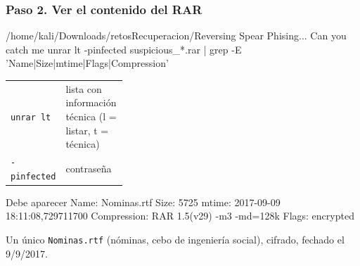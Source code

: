 \documentclass[11pt,a4paper]{article}
\begin{document}
\subsubsection*{Paso 2. Ver el contenido del RAR}
\begin{comando}{/home/kali/Downloads/retosRecuperacion/Reversing Spear Phising... Can you catch me}
unrar lt -pinfected suspicious_*.rar | grep -E 'Name|Size|mtime|Flags|Compression'
\end{comando}
\begin{tcolorbox}[enhanced, breakable, colback=gray!3, colframe=gray!35, boxrule=0.3pt, arc=1pt, left=4pt, right=4pt, top=2pt, bottom=2pt, fonttitle=\sffamily\scriptsize\bfseries, coltitle=black!70, colbacktitle=gray!10, title={Qué hace cada parte}, attach title to upper, before skip=2pt, after skip=4pt, fontupper=\small]
\par{\renewcommand{\arraystretch}{1.12}\begin{tabularx}{\linewidth}{@{}>{\raggedright\arraybackslash}p{0.33\linewidth}>{\raggedright\arraybackslash}X@{}}
\texttt{unrar lt} & lista con información técnica (l = listar, t = técnica) \\
\texttt{-pinfected} & contraseña \\
\end{tabularx}}
\end{tcolorbox}
\begin{salida}{Debe aparecer}
        Name: Nominas.rtf
        Size: 5725
       mtime: 2017-09-09 18:11:08,729711700
 Compression: RAR 1.5(v29) -m3 -md=128k
       Flags: encrypted 
\end{salida}
\begin{nota}Un único \texttt{Nominas.rtf} (nóminas, cebo de ingeniería social), cifrado, fechado el 9/9/2017.\end{nota}
\end{document}
